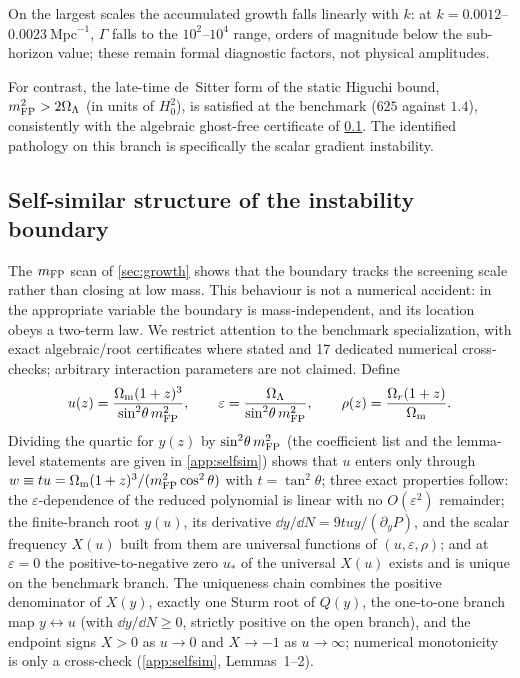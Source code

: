 On the largest scales the accumulated growth falls linearly with $k$: at $k=0.0012$--$0.0023\ \mathrm{Mpc}^{-1}$, $\Gamma$ falls to the $10^2$--$10^4$ range, orders of magnitude below the sub-horizon value; these remain formal diagnostic factors, not physical amplitudes.

For contrast, the late-time de~Sitter form of the static Higuchi bound, $m_{\mathrm{FP}}^2>2\Omega_{\Lambda}$ (in units of $H_0^2$), is satisfied at the benchmark ($625$ against $1.4$), consistently with the algebraic ghost-free certificate of \cref{sec:selfsim}. The identified pathology on this branch is specifically the scalar gradient instability.

\subsection{Self-similar structure of the instability boundary}\label{sec:selfsim}
The $m_{\mathrm{FP}}$ scan of \cref{sec:growth} shows that the boundary tracks the screening scale rather than closing at low mass. This behaviour is not a numerical accident: in the appropriate variable the boundary is mass-independent, and its location obeys a two-term law. We restrict attention to the benchmark specialization, with exact algebraic/root certificates where stated and 17 dedicated numerical cross-checks; arbitrary interaction parameters are not claimed. Define
\begin{equation}
u(z)=\frac{\Omega_{\mathrm m}(1+z)^3}{\sin^2\!\theta\,m_{\mathrm{FP}}^2},\qquad
\varepsilon=\frac{\Omega_{\Lambda}}{\sin^2\!\theta\,m_{\mathrm{FP}}^2},\qquad
\rho(z)=\frac{\Omega_{r}(1+z)}{\Omega_{\mathrm m}}.
\end{equation}
Dividing the quartic for $y(z)$ by $\sin^2\!\theta\,m_{\mathrm{FP}}^2$ (the coefficient list and the lemma-level statements are given in \cref{app:selfsim}) shows that $u$ enters only through $w\equiv tu=\Omega_{\mathrm m}(1+z)^3/(m_{\mathrm{FP}}^2\cos^2\theta)$ with $t=\tan^2\theta$; three exact properties follow: the $\varepsilon$-dependence of the reduced polynomial is linear with no $O(\varepsilon^2)$ remainder; the finite-branch root $y(u)$, its derivative $\dd y/\dd N=9tuy/(\partial_yP)$, and the scalar frequency $X(u)$ built from them are universal functions of $(u,\varepsilon,\rho)$; and at $\varepsilon=0$ the positive-to-negative zero $u_*$ of the universal $X(u)$ exists and is unique on the benchmark branch. The uniqueness chain combines the positive denominator of $X(y)$, exactly one Sturm root of $Q(y)$, the one-to-one branch map $y\leftrightarrow u$ (with $\dd y/\dd N\ge0$, strictly positive on the open branch), and the endpoint signs $X>0$ as $u\to0$ and $X\to-1$ as $u\to\infty$; numerical monotonicity is only a cross-check (\cref{app:selfsim}, Lemmas~1--2).

